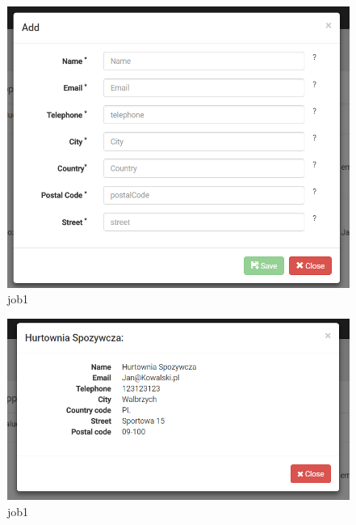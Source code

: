 \documentclass[a4paper,11pt,twoside]{report}
\theoremstyle{definition}
\begin{document}
\begin{figure}[h!]
\begin{center}
\includegraphics[width=\textwidth]{AS/supplier/2}
\end{center}
\caption{job1}
\end{figure}
\thispagestyle{empty}


\begin{figure}[h!]
\begin{center}
\includegraphics[width=\textwidth]{AS/supplier/3}
\end{center}
\caption{job1}
\end{figure}
\thispagestyle{empty}
\end{document}
